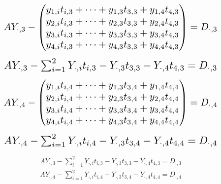 \documentclass[]{article}
\begin{document}
\begin{equation}
\resizebox{.9\hsize}{!}{$
	AY_{\cdot,3} - 
	\begin{pmatrix}
y_{1,i}t_{i,3} + \cdots +  y_{1,3}t_{3,3} +  y_{1,4}t_{4,3}\\
y_{2,i}t_{i,3} + \cdots + y_{2,3}t_{3,3}  +  y_{2,4}t_{4,3}\\
y_{3,i}t_{i,3} + \cdots + y_{3,3}t_{3,3}  +  y_{3,4}t_{4,3}\\
y_{4,i}t_{i,3} + \cdots  + y_{4,3}t_{3,3}  +  y_{4,4}t_{4,3}\\
	\end{pmatrix}
	= D_{\cdot,3}
	$}
\end{equation}


\begin{equation}
\resizebox{.9\hsize}{!}{$
	AY_{\cdot,3} - \sum_{i=1}^{2} Y_{\cdot,i}t_{i,3} - Y_{\cdot,3}t_{3,3} - Y_{\cdot,4}t_{4,3} = D_{\cdot,3}
	$}
\end{equation}


\begin{equation}
\resizebox{.9\hsize}{!}{$
	AY_{\cdot,4} - 
	\begin{pmatrix}
	y_{1,i}t_{i,4} + \cdots +  y_{1,3}t_{3,4} +  y_{1,4}t_{4,4}\\
	y_{2,i}t_{i,4} + \cdots + y_{2,3}t_{3,4}  +  y_{2,4}t_{4,4}\\
	y_{3,i}t_{i,4} + \cdots + y_{3,3}t_{3,4}  +  y_{3,4}t_{4,4}\\
	y_{4,i}t_{i,4} + \cdots  + y_{4,3}t_{3,4}  +  y_{4,4}t_{4,4}\\
	\end{pmatrix}
	= D_{\cdot,4}
	$}
\end{equation}

\begin{equation}
\resizebox{.9\hsize}{!}{$
	AY_{\cdot,4} - \sum_{i=1}^{2} Y_{\cdot,i}t_{i,4} - Y_{\cdot,3}t_{3,4} - Y_{\cdot,4}t_{4,4} = D_{\cdot,4}
	$}
\end{equation}

\begin{gather}
	AY_{\cdot,3} - \sum_{i=1}^{2} Y_{\cdot,i}t_{i,3} - Y_{\cdot,3}t_{3,3} - Y_{\cdot,4}t_{4,3} = D_{\cdot,3}\\
	AY_{\cdot,4} - \sum_{i=1}^{2} Y_{\cdot,i}t_{i,4} - Y_{\cdot,3}t_{3,4} - Y_{\cdot,4}t_{4,4} = D_{\cdot,4}
\end{gather}
\end{document}
